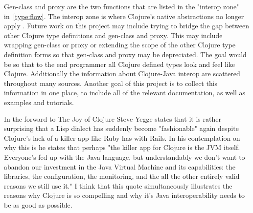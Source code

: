 \documentclass[12pt]{article}
\begin{document}
	Gen-class and proxy are the two functions that are listed in the "interop zone" in~\ref{type:flow}. The interop zone is where Clojure's native abstractions no longer apply \cite{choosing-types}. Future work on this project may include trying to bridge the gap between other Clojure type definitions and gen-class and proxy. This may include wrapping gen-class or proxy or extending the scope of the other Clojure type definition forms so that gen-class and proxy may be depreciated. The goal would be so that to the end programmer all Clojure defined types look and feel like Clojure. 
	Additionally the information about Clojure-Java interop are scattered throughout many sources. Another goal of this project is to collect this information in one place, to include all of the relevant documentation, as well as examples and tutorials.
	
	In the forward to The Joy of Clojure\cite{joy} Steve Yegge states that it is rather surprising that a Lisp dialect has suddenly become "fashionable" again despite Clojure's lack of a killer app like Ruby has with Rails. In his contemplation on why this is he states that perhaps "the killer app for Clojure is the JVM itself. Everyone's fed up with the Java language, but understandably we don't want to abandon our investment in the Java Virtual Machine and its capabilities: the libraries, the configuration, the monitoring, and the all the other entirely valid reasons we still use it." I think that this quote simultaneously illustrates the reasons why Clojure is so compelling and why it's Java interoperability needs to be as good as possible.




%
%

%  
%
%




\end{document}

